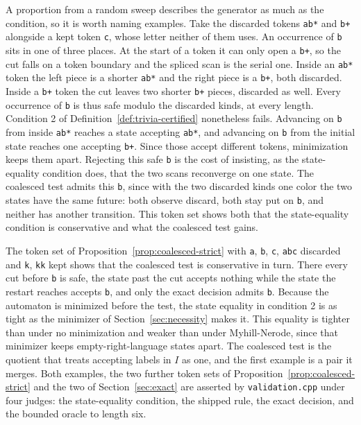 \documentclass[11pt,a4paper]{article}
\theoremstyle{definition}
\theoremstyle{plain}
\newcommand{\code}[1]{\texttt{#1}}
\begin{document}
A proportion from a random sweep describes the generator as much as the condition, so it is worth naming examples. Take
the discarded tokens \code{ab*} and \code{b+} alongside a kept token \code{c}, whose letter neither of them uses. An
occurrence of \code{b} sits in one of three places. At the start of a token it can only open a \code{b+}, so the cut
falls on a token boundary and the spliced scan is the serial one. Inside an \code{ab*} token the left piece is a shorter
\code{ab*} and the right piece is a \code{b+}, both discarded. Inside a \code{b+} token the cut leaves two shorter
\code{b+} pieces, discarded as well. Every occurrence of \code{b} is thus safe modulo the discarded kinds, at every
length. Condition 2 of Definition~\ref{def:trivia-certified} nonetheless fails. Advancing on \code{b} from inside
\code{ab*} reaches a state accepting \code{ab*}, and advancing on \code{b} from the initial state reaches one accepting
\code{b+}. Since those accept different tokens, minimization keeps them apart. Rejecting this safe \code{b} is the cost
of insisting, as the state-equality condition does, that the two scans reconverge on one state. The coalesced test
admits this \code{b}, since with the two discarded kinds one color the two states have the same future: both observe
discard, both stay put on \code{b}, and neither has another transition. This token set shows both that the
state-equality condition is conservative and what the coalesced test gains.

The token set of Proposition~\ref{prop:coalesced-strict} with \code{a}, \code{b}, \code{c}, \code{abc} discarded and
\code{k}, \code{kk} kept shows that the coalesced test is conservative in turn. There every cut before \code{b} is safe,
the state past the cut accepts nothing while the state the restart reaches accepts \code{b}, and only the exact decision
admits \code{b}. Because the automaton is minimized before the test, the state equality in condition 2 is as tight as
the minimizer of Section~\ref{sec:necessity} makes it. This equality is tighter than under no minimization and weaker
than under Myhill-Nerode, since that minimizer keeps empty-right-language states apart. The coalesced test is the
quotient that treats accepting labels in $I$ as one, and the first example is a pair it merges. Both examples, the two
further token sets of Proposition~\ref{prop:coalesced-strict} and the two of Section~\ref{sec:exact} are asserted by
\code{validation.cpp} under four judges: the state-equality condition, the shipped rule, the exact decision, and the
bounded oracle to length six.
\end{document}
